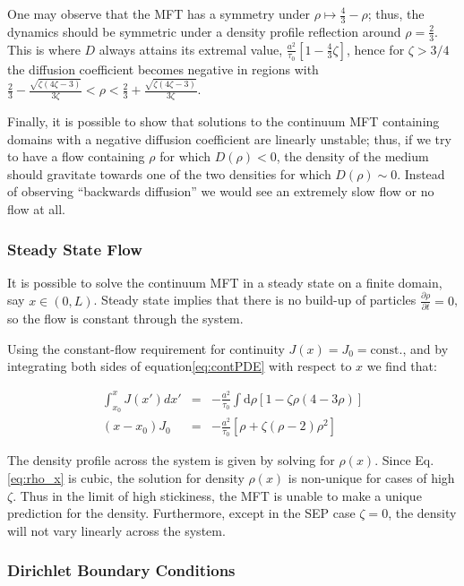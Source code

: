 \documentclass[
reprint, amsmath,amssymb, aps,
]{revtex4-1}
\newcommand{\partDeriv}[2]{\frac{\partial #1}{\partial #2}}
\begin{document}
One may observe that the 
MFT has a symmetry under $\rho \mapsto \frac{4}{3} - \rho$; thus, the
dynamics should be symmetric under a density profile reflection around
$\rho = \frac{2}{3}$. This is where $D$ always attains its extremal
value, $ \frac{a^2}{\tau_0}\left[1 - \frac{4}{3}\zeta\right]$, hence
for $\zeta>3/4$ the diffusion coefficient becomes negative in regions
with $\frac{2}{3} - \frac{\sqrt{\zeta\left(4\zeta - 3\right)}}{3\zeta}
< \rho < \frac{2}{3} + \frac{\sqrt{\zeta\left(4\zeta -
    3\right)}}{3\zeta}$. 

Finally, it is possible to show that
solutions to the continuum MFT containing domains with a negative
diffusion coefficient are linearly unstable; thus, if we try to have a
flow containing $\rho$ for which $D(\rho)<0$, the density of the
medium should gravitate towards one of the two densities for which $D(\rho)\sim
0$. Instead of observing ``backwards diffusion'' we would see an
extremely slow flow or no flow at all. 

\subsubsection{Steady State Flow}

It is possible to solve the continuum MFT in a steady state on a
finite domain, say $x\in(0, L)$. Steady state implies that there is no
build-up of particles $\partDeriv{\rho}{t}=0$, so the flow is constant through the system.

Using the constant-flow requirement for continuity
$J(x)=J_0=\mathrm{const.}$, and by integrating both sides of
equation\ref{eq:contPDE} with respect to $x$ we find that:

\begin{eqnarray}
 \int_{x_0}^x J(x')dx' &=& -\frac{a^2}{\tau_0} \int \! \! \mathrm{d} \rho \left[1 - \zeta
   \rho\left(4-3\rho\right) \right]\\ (x-x_0)J_0 & = & -\frac{a^2}{\tau_0}\left[ \rho + \zeta (\rho -
 2) \rho^2 \right ]
\label{eq:rho_x}
\end{eqnarray}

The density profile across the system is given by solving for
$\rho(x)$.  Since Eq.\ref{eq:rho_x} is cubic, the solution for density
$\rho(x)$ is non-unique for cases of high $\zeta$.  Thus in the limit of
high stickiness, the MFT is unable to make a unique prediction for the
density.  Furthermore, except in the SEP case $\zeta=0$, the density
will not vary linearly across the system.

\subsubsection{Dirichlet Boundary Conditions}
\end{document}

